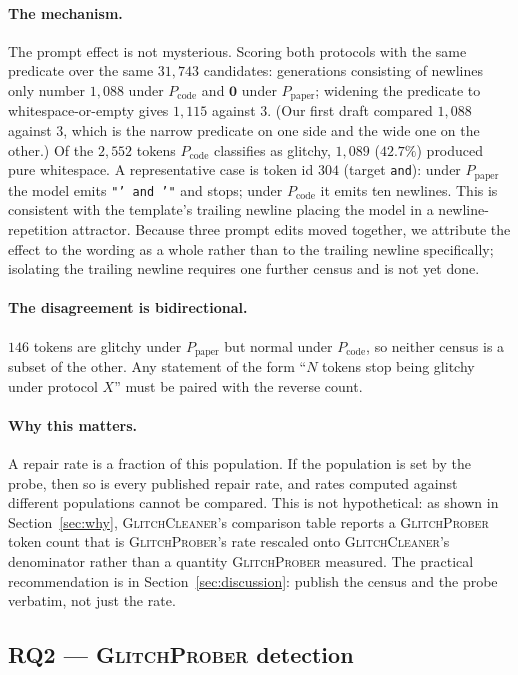 \documentclass[11pt,a4paper]{article}
\newcommand{\gp}{\textsc{GlitchProber}}
\newcommand{\gc}{\textsc{GlitchCleaner}}
\newcommand{\Ppaper}{$P_{\mathrm{paper}}$}
\newcommand{\Pcode}{$P_{\mathrm{code}}$}
\begin{document}
\paragraph{The mechanism.} The prompt effect is not mysterious. Scoring both
protocols with the same predicate over the same $31{,}743$ candidates: generations
consisting of newlines only number $1{,}088$ under \Pcode{} and $\mathbf{0}$ under
\Ppaper{}; widening the predicate to whitespace-or-empty gives $1{,}115$ against
$3$. (Our first draft compared $1{,}088$ against $3$, which is the narrow predicate
on one side and the wide one on the other.) Of the $2{,}552$ tokens \Pcode{}
classifies as glitchy, $1{,}089$ ($42.7\%$) produced pure whitespace. A
representative case is token id $304$ (target \texttt{and}): under \Ppaper{} the
model emits \texttt{"' and '"} and stops; under \Pcode{} it emits ten newlines.
This is consistent with the template's trailing newline placing the model in a
newline-repetition attractor. Because three prompt edits moved together, we
attribute the effect to the wording as a whole rather than to the trailing newline
specifically; isolating the trailing newline requires one further census and is
not yet done.

\paragraph{The disagreement is bidirectional.} $146$ tokens are glitchy under
\Ppaper{} but normal under \Pcode{}, so neither census is a subset of the other.
Any statement of the form ``$N$ tokens stop being glitchy under protocol $X$''
must be paired with the reverse count.

\paragraph{Why this matters.} A repair rate is a fraction of this population. If
the population is set by the probe, then so is every published repair rate, and
rates computed against different populations cannot be compared. This is not
hypothetical: as shown in Section~\ref{sec:why}, \gc{}'s comparison table reports
a \gp{} token count that is \gp{}'s rate rescaled onto \gc{}'s denominator rather
than a quantity \gp{} measured. The practical recommendation is in
Section~\ref{sec:discussion}: publish the census and the probe verbatim, not just
the rate.

\subsection{RQ2 --- \gp{} detection}
\label{sec:rq2}
\end{document}
